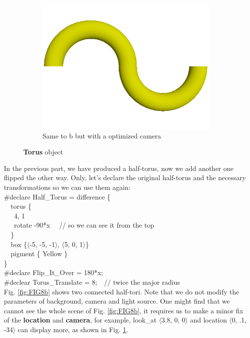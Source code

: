 \documentclass[fleqn,10pt]{wlscirep}
\begin{document}
\begin{figure}
\begin{subfigure}{0.31\textwidth}
\includegraphics[width=\linewidth]{FIG8c}
\caption{Same to b but with a optimized camera} \label{fig:FIG8c}
\end{subfigure}
\caption{\textbf{Torus} object} \label{}
\end{figure}
In the previous part, we have produced a half-torus, now we add another one flipped the other way. Only, let's declare the original half-torus and the necessary transformations so we can use them again: \\
{\color{blue}
\#declare Half\_Torus = difference \{  \\
\ \ torus \{ \\
\ \ \ 4, 1  \\
\ \ \ rotate -90*x \ \ // so we can see it from the top  \\
\ \ \}  \\
\ \ box \{$\langle$-5, -5, -1$\rangle$, $\langle$5, 0, 1$\rangle$\}  \\
\ \ pigment \{ Yellow \}  \\
\}  \\
\#declare Flip\_It\_Over = 180*x;  \\
\#declear Torus\_Translate = 8;\ \ // twice the major radius
}\\
Fig. \ref{fig:FIG8b} shows two connected half-tori. Note that we do not modify the parameters of background, camera and light source. One might find that we cannot see the whole scene of Fig. \ref{fig:FIG8b}, it requires us to make a minor fix of the \textbf{location} and \textbf{camera}, for example, look\_at $\langle$3.8, 0, 0$\rangle$ and location $\langle$0, .1, -34$\rangle$ can display more, as shown in Fig. \ref{fig:FIG8c}.\\
\end{document}
